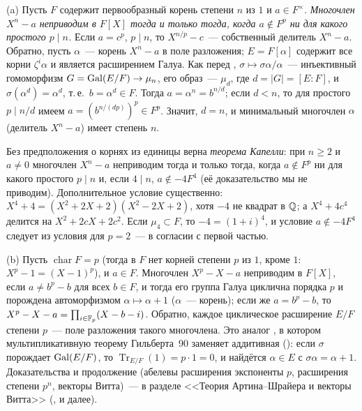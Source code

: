 \begin{aside}[5.29]
(a) Пусть $F$ содержит первообразный корень степени $n$ из $1$ и $a\in F^\times$. \emph{Многочлен $X^n-a$ неприводим в
$F[X]$ тогда и только тогда, когда $a\notin F^p$ ни для какого простого $p\mid n$.} Если $a=c^p$, $p\mid n$, то
$X^{n/p}-c$~--- собственный делитель $X^n-a$. Обратно, пусть $\alpha$~--- корень $X^n-a$ в поле разложения; $E=F[\alpha]$
содержит все корни $\zeta^i\alpha$ и является расширением Галуа. Как перед , $\sigma\mapsto\sigma\alpha/\alpha$~---
инъективный гомоморфизм $G=\operatorname{Gal}(E/F)\to\mu_n$, его образ~--- $\mu_d$, где $d=|G|=[E:F]$, и $\sigma(\alpha^d)=\alpha^d$, т.\,е.\
$b=\alpha^d\in F$. Тогда $a=\alpha^n=b^{n/d}$; если $d<n$, то для простого $p\mid n/d$ имеем $a=(b^{n/(dp)})^p\in F^p$.
Значит, $d=n$, и минимальный многочлен $\alpha$ (делитель $X^n-a$) имеет степень $n$.

Без предположения о корнях из единицы верна \emph{теорема Капелли}: при $n\ge2$ и $a\ne0$ многочлен $X^n-a$ неприводим
тогда и только тогда, когда $a\notin F^p$ ни для какого простого $p\mid n$ и, если $4\mid n$, $a\notin-4F^4$ (её
доказательство мы не приводим). Дополнительное условие существенно: $X^4+4=(X^2+2X+2)(X^2-2X+2)$, хотя $-4$ не квадрат в
$\mathbb Q$; а $X^4+4c^4$ делится на $X^2+2cX+2c^2$. Если $\mu_4\subset F$, то $-4=(1+i)^4$, и условие $a\notin-4F^4$
следует из условия для $p=2$~--- в согласии с первой частью.

(b) Пусть $\operatorname{char}F=p$ (тогда в $F$ нет корней степени $p$ из $1$, кроме $1$: ${X^p-1=(X-1)^p}$), и $a\in F$.
Многочлен $X^p-X-a$ неприводим в $F[X]$, если ${a\ne b^p-b}$ для всех ${b\in F}$, и тогда его группа Галуа циклична порядка
$p$ и порождена автоморфизмом $\alpha\mapsto\alpha+1$ ($\alpha$~--- корень); если же ${a=b^p-b}$, то
${X^p-X-a=\prod_{i\in\mathbb F_p}(X-b-i)}$. Обратно, каждое циклическое расширение $E/F$ степени $p$~--- поле разложения такого
многочлена. Это аналог \rf{5.27}, в котором мультипликативную теорему Гильберта~90 заменяет аддитивная (\rf{5.25a}):
если $\sigma$ порождает $\operatorname{Gal}(E/F)$, то $\operatorname{Tr}_{E/F}(1)=p\cdot1=0$, и найдётся $\alpha\in E$ с
$\sigma\alpha=\alpha+1$. Доказательства и продолжение (абелевы расширения экспоненты $p$, расширения степени $p^n$,
векторы Витта)~--- в разделе <<Теория Артина--Шрайера и векторы Витта>> (\rf{5.32c}, \rf{5.32d} и далее).
\end{aside}
